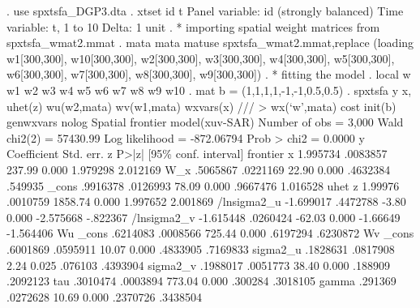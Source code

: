 . use spxtsfa_DGP3.dta
{\smallskip}
. xtset id t 
{\smallskip}
Panel variable: id (strongly balanced)
 Time variable: t, 1 to 10
         Delta: 1 unit
{\smallskip}
. * importing spatial weight matrices from spxtsfa_wmat2.mmat
. mata mata matuse spxtsfa_wmat2.mmat,replace
(loading w1[300,300], w10[300,300], w2[300,300], w3[300,300], w4[300,300], 
w5[300,300], w6[300,300], w7[300,300], w8[300,300], w9[300,300])
{\smallskip}
. * fitting the model
. local w w1 w2 w3 w4 w5 w6 w7 w8 w9 w10
{\smallskip}
. mat b = (1,1,1,1,-1,-1,0.5,0.5)
{\smallskip}
. spxtsfa y x, uhet(z) wu(w2,mata) wv(w1,mata) wxvars(x) ///
>              wx(`w',mata) cost init(b) genwxvars nolog
{\smallskip}
Spatial frontier model(xuv-SAR)                       Number of obs =    3,000
                                                      Wald chi2(2)  = 57430.99
Log likelihood = -872.06794                           Prob > chi2   =   0.0000
{\smallskip}
           y {\VBAR} Coefficient  Std. err.      z    P>|z|     [95\% conf. interval]
frontier     {\VBAR}
           x {\VBAR}   1.995734   .0083857   237.99   0.000     1.979298    2.012169
         W_x {\VBAR}   .5065867   .0221169    22.90   0.000     .4632384     .549935
       _cons {\VBAR}   .9916378   .0126993    78.09   0.000     .9667476    1.016528
uhet         {\VBAR}
           z {\VBAR}    1.99976   .0010759  1858.74   0.000     1.997652    2.001869
 /lnsigma2_u {\VBAR}  -1.699017   .4472788    -3.80   0.000    -2.575668    -.822367
 /lnsigma2_v {\VBAR}  -1.615448   .0260424   -62.03   0.000     -1.66649   -1.564406
Wu           {\VBAR}
       _cons {\VBAR}   .6214083   .0008566   725.44   0.000     .6197294    .6230872
Wv           {\VBAR}
       _cons {\VBAR}   .6001869   .0595911    10.07   0.000     .4833905    .7169833
    sigma2_u {\VBAR}   .1828631   .0817908     2.24   0.025      .076103    .4393904
    sigma2_v {\VBAR}   .1988017   .0051773    38.40   0.000      .188909    .2092123
         tau {\VBAR}   .3010474   .0003894   773.04   0.000      .300284    .3018105
       gamma {\VBAR}    .291369   .0272628    10.69   0.000     .2370726    .3438504
